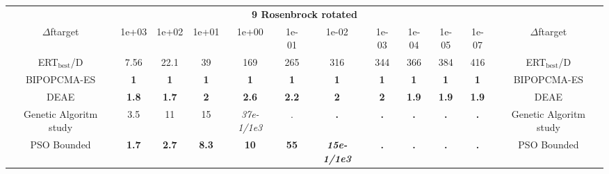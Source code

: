 \begin{tabular}{cccccccccccc}
 & \multicolumn{10}{c}{{\normalsize \textbf{9 Rosenbrock rotated}}}\\
$\Delta$ftarget& 1e+03& 1e+02& 1e+01& 1e+00& 1e-01& 1e-02& 1e-03& 1e-04& 1e-05& 1e-07 & $\Delta$ftarget \\
ERT$_{\textrm{best}}$/D& 7.56& 22.1& 39& 169& 265& 316& 344& 366& 384& 416 & ERT$_{\textrm{best}}$/D \\
\hline
BIPOPCMA-ES & \textbf{1} & \textbf{1} & \textbf{1} & \textbf{1} & \textbf{1} & \textbf{1} & \textbf{1} & \textbf{1} & \textbf{1} & \textbf{1} & BIPOPCMA-ES \cite{add_an_entry_for_BIPOPCMA-ES_in_bbob.bib}\\
DEAE & \textbf{1.8} & \textbf{1.7} & \textbf{2} & \textbf{2.6} & \textbf{2.2} & \textbf{2} & \textbf{2} & \textbf{1.9} & \textbf{1.9} & \textbf{1.9} & DEAE \cite{add_an_entry_for_DEAE_in_bbob.bib}\\
Genetic Algoritm study & 3.5 & 11 & 15 & \textit{37e-1}\textit{/1e3} & . & \textbf{.} & \textbf{.} & \textbf{.} & \textbf{.} & \textbf{.} & Genetic Algoritm study \cite{add_an_entry_for_Genetic Algoritm study_in_bbob.bib}\\
PSO Bounded & \textbf{1.7} & \textbf{2.7} & \textbf{8.3} & \textbf{10} & \textbf{55} & \textbf{\textit{15e-1}\textit{/1e3}} & \textbf{.} & \textbf{.} & \textbf{.} & \textbf{.} & PSO Bounded \cite{add_an_entry_for_PSO Bounded_in_bbob.bib}
\end{tabular}
